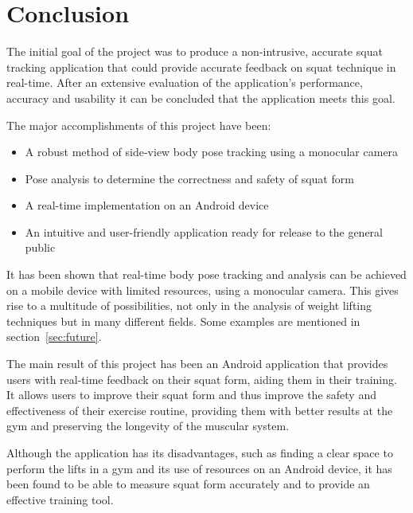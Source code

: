 \section{Conclusion}

The initial goal of the project was to produce a non-intrusive, accurate squat tracking application that could provide accurate feedback on squat technique in real-time. After an extensive evaluation of the application's performance, accuracy and usability it can be concluded that the application meets this goal.

The major accomplishments of this project have been:

\begin{itemize}
	\item A robust method of side-view body pose tracking using a monocular camera
	\item Pose analysis to determine the correctness and safety of squat form
	\item A real-time implementation on an Android device
	\item An intuitive and user-friendly application ready for release to the general public
\end{itemize}

It has been shown that real-time body pose tracking and analysis can be achieved on a mobile device with limited resources, using a monocular camera. This gives rise to a multitude of possibilities, not only in the analysis of weight lifting techniques but in many different fields. Some examples are mentioned in section~\ref{sec:future}.

The main result of this project has been an Android application that provides users with real-time feedback on their squat form, aiding them in their training. It allows users to improve their squat form and thus improve the safety and effectiveness of their exercise routine, providing them with better results at the gym and preserving the longevity of the muscular system.

Although the application has its disadvantages, such as finding a clear space to perform the lifts in a gym and its use of resources on an Android device, it has been found to be able to measure squat form accurately and to provide an effective training tool.